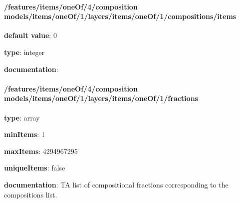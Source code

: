 \begin{itemized}
\paragraph{/features/items/oneOf/4/composition models/items/oneOf/1/layers/items/oneOf/1/compositions/items} \begin{itemized}
\item {\bf default value}: 0
\item {\bf type}: integer
\item {\bf documentation}: 
\end{itemized}\end{itemized}\paragraph{/features/items/oneOf/4/composition models/items/oneOf/1/layers/items/oneOf/1/fractions} \begin{itemized}
\item {\bf type}: array
\item {\bf minItems}: 1
\item {\bf maxItems}: 4294967295
\item {\bf uniqueItems}: false
\item {\bf documentation}: TA list of compositional fractions corresponding to the compositions list.

\end{itemized}
